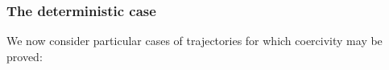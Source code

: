 


\subsubsection{The deterministic case}

We now consider particular cases of trajectories for which coercivity may be proved:

